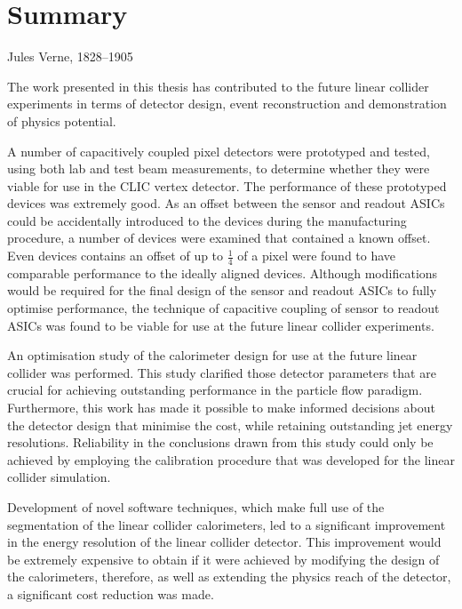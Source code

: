 \chapter{Summary}
\label{chap:summary}

{Jules Verne, 1828--1905}



The work presented in this thesis has contributed to the future linear collider experiments in terms of detector design, event reconstruction and demonstration of physics potential.  

A number of capacitively coupled pixel detectors were prototyped and tested, using both lab and test beam measurements, to determine whether they were viable for use in the CLIC vertex detector.  The performance of these prototyped devices was extremely good.  As an offset between the sensor and readout ASICs could be accidentally introduced to the devices during the manufacturing procedure, a number of devices were examined that contained a known offset.  Even devices contains an offset of up to $\frac{1}{4}$ of a pixel were found to have comparable performance to the ideally aligned devices.  Although modifications would be required for the final design of the sensor and readout ASICs to fully optimise performance, the technique of capacitive coupling of sensor to readout ASICs was found to be viable for use at the future linear collider experiments.  

An optimisation study of the calorimeter design for use at the future linear collider was performed.  This study clarified those detector parameters that are crucial for achieving outstanding performance in the particle flow paradigm.  Furthermore, this work has made it possible to make informed decisions about the detector design that minimise the cost, while retaining outstanding jet energy resolutions.  Reliability in the conclusions drawn from this study could only be achieved by employing the calibration procedure that was developed for the linear collider simulation.  

Development of novel software techniques, which make full use of the segmentation of the linear collider calorimeters, led to a significant improvement in the energy resolution of the linear collider detector.  This improvement would be extremely expensive to obtain if it were achieved by modifying the design of the calorimeters, therefore, as well as extending the physics reach of the detector, a significant cost reduction was made.   

